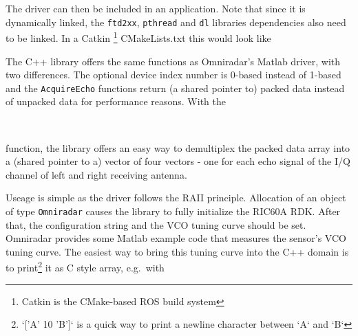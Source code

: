 The driver can then be included in an application. Note that since it is
dynamically linked, the \texttt{ftd2xx}, \texttt{pthread} and
\texttt{dl} libraries dependencies also need to be linked. In a Catkin
\footnote{Catkin is the CMake-based ROS build system} CMakeLists.txt
this would look like

\begin{Shaded}
\begin{Highlighting}[]
\NormalTok{(}
\NormalTok{)}
\end{Highlighting}
\end{Shaded}

The C++ library offers the same functions as Omniradar's Matlab driver,
with two differences. The optional device index number is 0-based
instead of 1-based and the \texttt{AcquireEcho} functions return (a shared pointer
to) packed data instead of unpacked data for performance reasons. With
the

\begin{Shaded}
\begin{Highlighting}[]
 \NormalTok{ > > >}\\
\end{Highlighting}
\end{Shaded}

function, the library offers an easy way to demultiplex the packed data
array into a (shared pointer to a) vector of four vectors - one for each
echo signal of the I/Q channel of left and right receiving antenna.

Useage is simple as the driver follows the RAII principle. Allocation of
an object of type \texttt{Omniradar} causes the library to fully
initialize the RIC60A RDK. After that, the configuration string and the
VCO tuning curve should be set. Omniradar provides some Matlab example
code that measures the sensor's VCO tuning curve. The easiest way to
bring this tuning curve into the C++ domain is to
print\footnote{`['A' 10 'B']` is a quick way to print a newline character between `A` and `B`}
it as C style array, e.g.~with

